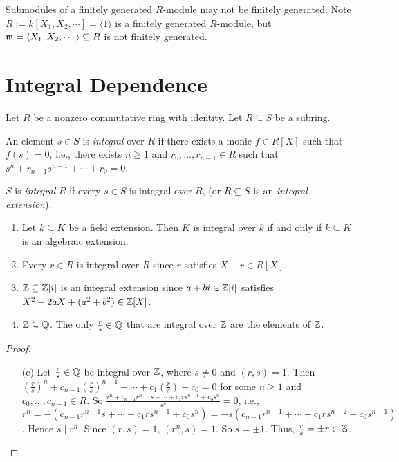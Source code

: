 \begin{example}\label{5.7}
    Submodules of a finitely generated $R$-module may not be finitely generated. Note $R := k[X_1,X_2,\cdots] = \langle 1 \rangle$ is a finitely generated $R$-module, but $\mathfrak{m} = \langle X_1,X_2,\cdots \rangle \subseteq R$ is not finitely generated.
\end{example}

\section*{Integral Dependence}

Let $R$ be a nonzero commutative ring with identity. Let $R \subseteq S$ be a subring.

\begin{definition}\label{5.8}
    An element $s \in S$ is \emph{integral} over $R$ if there exists a monic $f \in R[X]$ such that $f(s) = 0$, i.e., there exists $n \geq 1$ and $r_0,\ldots,r_{n-1} \in R$ such that $s^{n} + r_{n-1}s^{n-1} + \cdots + r_0 = 0$. \par 
    $S$ is \emph{integral} $R$ if every $s \in S$ is integral over $R$, (or $R \subseteq S$ is an \emph{integral extension}).
\end{definition}

\begin{example}\label{5.9}
    \begin{enumerate}
        \item Let $k \subseteq K$ be a field extension. Then $K$ is integral over $k$ if and only if $k \subseteq K$ is an algebraic extension. 
        \item Every $r \in R$ is integral over $R$ since $r$ satisfies $X-r \in R[X]$. 
        \item $\mathbb{Z} \subseteq \mathbb{Z}[i]$ is an integral extension since $a+bi \in \mathbb{Z}[i]$ satisfies $X^{2}-2aX+(a^{2}+b^{2}) \in \mathbb{Z}[X]$.
        \item $\mathbb{Z} \subseteq \mathbb{Q}$. The only $\frac{r}{s} \in \mathbb{Q}$ that are integral over $\mathbb{Z}$ are the elements of $\mathbb{Z}$.
    \end{enumerate}
\end{example}

\begin{proof}
    \begin{enumerate}
        \item[(c)] Let $\frac{r}{s} \in \mathbb{Q}$ be integral over $\mathbb{Z}$, where $s \neq 0$ and $(r,s) = 1$. Then $(\frac{r}{s})^{n} + c_{n-1} (\frac{r}{s})^{n-1} + \cdots + c_1(\frac{r}{s}) + c_0 = 0$ for some $n \geq 1$ and $c_0,\ldots,c_{n-1} \in R$. So $\frac{r^{n} + c_{n-1}r^{n-1}s + \cdots + c_1rs^{n-1} + c_0s^{n}}{s^{n}} = 0$, i.e., $r^{n} = -(c_{n-1}r^{n-1}s + \cdots + c_1r s^{n-1} + c_0s^{n}) = -s(c_{n-1}r^{n-1} + \cdots + c_1rs^{n-2} + c_0s^{n-1})$. Hence $s \mid r^{n}$. Since $(r,s) = 1$, $(r^{n},s) = 1$. So $s = \pm 1$. Thus, $\frac{r}{s} = \pm r \in \mathbb{Z}$. \qedhere
    \end{enumerate}
\end{proof}

